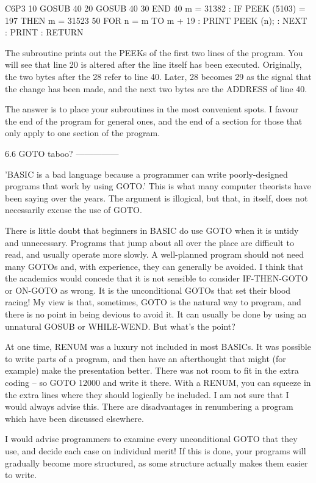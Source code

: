         C6P3
        10 GOSUB 40
        20 GOSUB 40
        30 END
        40 m = 31382 : IF PEEK (5103) = 197 THEN m = 31523
        50 FOR n = m TO m + 19 : PRINT PEEK (n); : NEXT : PRINT : RETURN

The subroutine prints out the PEEKs of the first two lines of the program. You 
will  see  that line 20 is altered after the line itself  has  been  executed. 
Originally, the two bytes after the 28 refer to line 40. Later, 28 becomes  29 
as  the signal that the change has been made, and the next two bytes  are  the 
ADDRESS of line 40.

The answer is to place your subroutines in the most convenient spots. I favour 
the  end of the program for general ones, and the end of a section  for  those 
that only apply to one section of the program.


6.6 GOTO taboo?
---------------

'BASIC  is  a  bad language because a  programmer  can  write  poorly-designed 
programs  that work by using GOTO.' This is what many computer theorists  have 
been  saying over the years. The argument is illogical, but that,  in  itself, 
does not necessarily excuse the use of GOTO.

There  is little doubt that beginners in BASIC do use GOTO when it  is  untidy 
and unnecessary. Programs that jump about all over the place are difficult  to 
read, and usually operate more slowly. A well-planned program should not  need 
many  GOTOs and, with experience, they can generally be avoided. I think  that 
the  academics would concede that it is not sensible to consider  IF-THEN-GOTO 
or  ON-GOTO  as  wrong. It is the unconditional GOTOs  that  set  their  blood 
racing!  My view is that, sometimes, GOTO is the natural way to  program,  and 
there  is  no point in being devious to avoid it. It can usually  be  done  by 
using an unnatural GOSUB or WHILE-WEND. But what's the point?

At  one time, RENUM was a luxury not included in most BASICs. It was  possible 
to  write  parts of a program, and then have an afterthought that  might  (for 
example) make the presentation better. There was not room to fit in the  extra 
coding  -- so GOTO 12000 and write it there. With a RENUM, you can squeeze  in 
the extra lines where they should logically be included. I am not sure that  I 
would  always  advise this. There are disadvantages in renumbering  a  program 
which have been discussed elsewhere.

I would advise programmers to examine every unconditional GOTO that they  use, 
and decide each case on individual merit! If this is done, your programs  will 
gradually become more structured, as some structure actually makes them easier 
to write.


